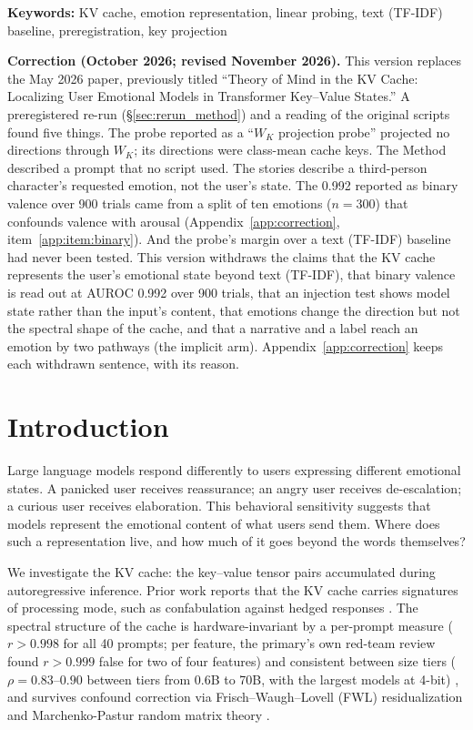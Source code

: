 \documentclass[11pt,a4paper]{article}
\begin{document}
\noindent\textbf{Keywords:} KV cache, emotion representation, linear probing, text (TF-IDF) baseline, preregistration, key projection

\begin{framed}
\noindent\textbf{Correction (October 2026; revised November 2026).} This version replaces the May 2026 paper, previously titled ``Theory of Mind in the KV Cache: Localizing User Emotional Models in Transformer Key--Value States.'' A preregistered re-run (\S\ref{sec:rerun_method}) and a reading of the original scripts found five things. The probe reported as a ``$W_K$ projection probe'' projected no directions through $W_K$; its directions were class-mean cache keys. The Method described a prompt that no script used. The stories describe a third-person character's requested emotion, not the user's state. The 0.992 reported as binary valence over 900 trials came from a split of ten emotions ($n = 300$) that confounds valence with arousal (Appendix~\ref{app:correction}, item~\ref{app:item:binary}). And the probe's margin over a text (TF-IDF) baseline had never been tested. This version withdraws the claims that the KV cache represents the user's emotional state beyond text (TF-IDF), that binary valence is read out at AUROC 0.992 over 900 trials, that an injection test shows model state rather than the input's content, that emotions change the direction but not the spectral shape of the cache, and that a narrative and a label reach an emotion by two pathways (the implicit arm). Appendix~\ref{app:correction} keeps each withdrawn sentence, with its reason.
\end{framed}

\section{Introduction}

Large language models respond differently to users expressing different emotional states. A panicked user receives reassurance; an angry user receives de-escalation; a curious user receives elaboration. This behavioral sensitivity suggests that models represent the emotional content of what users send them. Where does such a representation live, and how much of it goes beyond the words themselves?

We investigate the KV cache: the key--value tensor pairs accumulated during autoregressive inference. Prior work reports that the KV cache carries signatures of processing mode, such as confabulation against hedged responses \citep{lyra2026oracle}. The spectral structure of the cache is hardware-invariant by a per-prompt measure ($r > 0.998$ for all 40 prompts; per feature, the primary's own red-team review found $r > 0.999$ false for two of four features) and consistent between size tiers ($\rho = 0.83$--$0.90$ between tiers from 0.6B to 70B, with the largest models at 4-bit) \citep{lyra2026detecting}, and survives confound correction via Frisch--Waugh--Lovell (FWL) residualization \citep{frisch1933partial,lovell1963seasonal} and Marchenko-Pastur random matrix theory \citep{lyra2026oracle}.
\end{document}
